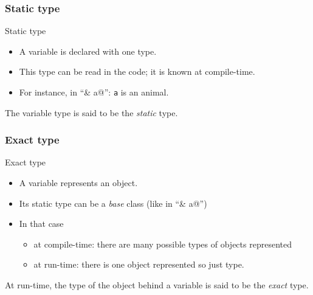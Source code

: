 \documentclass{beamer}
\newcommand{\code}[1]{{\scriptsize{\texttt{#1}}}\xspace}
\begin{document}
\begin{frame}
  \frametitle{Static type}

  \begin{block}{Static type}
    \begin{itemize}
      \item A variable is declared with one type.
      \item This type can be read in the code; it is known at compile-time.
      \item For instance, in ``\lstinline@animal& a@'': \code{a} is an animal.
    \end{itemize}
    
    The variable type is said to be the \emph{static} type.
  \end{block}
  
\end{frame}



\begin{frame}
  \frametitle{Exact type}
  
  \begin{block}{Exact type}
    \begin{itemize}
    \item A variable represents an object.
    \item Its static type can be a \textit{base} class (like in ``\lstinline@animal& a@'')
    \item In that case
      \begin{itemize}
      \item at compile-time: there are many possible types of objects represented
      \item at run-time: there is one object represented so just type.
      \end{itemize}
    \end{itemize}

    At run-time, the type of the object behind a variable is said to
    be the \emph{exact} type.
  \end{block}
  
\end{frame}
\end{document}
